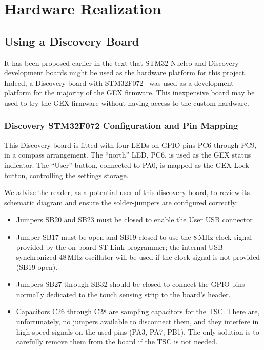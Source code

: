 \chapter{Hardware Realization} \label{sec:hwreal}

\section{Using a Discovery Board}

It has been proposed earlier in the text that STM32 Nucleo and Discovery development boards might be used as the hardware platform for this project. Indeed, a Discovery board with STM32F072~\cite{disco-f072} was used as a development platform for the majority of the GEX firmware. This inexpensive board may be used to try the GEX firmware without having access to the custom hardware.

\subsection{Discovery STM32F072 Configuration and Pin Mapping}

This Discovery board is fitted with four \glspl{LED} on \gls{GPIO} pins PC6 through PC9, in a compass arrangement. The ``north'' \gls{LED}, PC6, is used as the GEX status indicator. The ``User'' button, connected to PA0, is mapped as the GEX Lock button, controlling the settings storage.

We advise the reader, as a potential user of this discovery board, to review its schematic diagram and ensure the solder-jumpers are configured correctly:

\begin{itemize}
	\item Jumpers SB20 and SB23 must be closed to enable the User \gls{USB} connector
	
	\item Jumper SB17 must be open and SB19 closed to use the 8\,MHz clock signal provided by the on-board ST-Link programmer; the internal USB-synchronized 48\,MHz oscillator will be used if the clock signal is not provided (SB19 open).
	
	\item Jumpers SB27 through SB32 should be closed to connect the \gls{GPIO} pins normally dedicated to the touch sensing strip to the board's header. 
	
	\item Capacitors C26 through C28 are sampling capacitors for the \gls{TSC}. There are, unfortunately, no jumpers available to disconnect them, and they interfere in high-speed signals on the used pins (PA3, PA7, PB1). The only solution is to carefully remove them from the board if the \gls{TSC} is not needed.
\end{itemize} 


